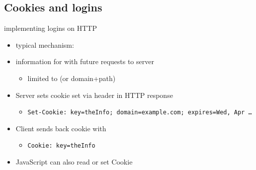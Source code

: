 
\subsection{Cookies and logins}

\begin{frame}{implementing logins on HTTP}
    \begin{itemize}
        \item typical mechanism: 
        \item information for  with future requests to server
        \begin{itemize}
            \item limited to  (or domain+path)
        \end{itemize}
    \item Server sets cookie set via header in HTTP response
        \begin{itemize}
            \item \texttt{\fontsize{10}{10}\selectfont Set-Cookie: key=theInfo; domain=example.com; expires=Wed, Apr \ldots}
        \end{itemize}
    \item Client sends back cookie with 
        \begin{itemize}
            \item \texttt{\fontsize{10}{10}\selectfont Cookie: key=theInfo}
        \end{itemize}
    \item JavaScript can also read or set Cookie
    \end{itemize}
\end{frame}

